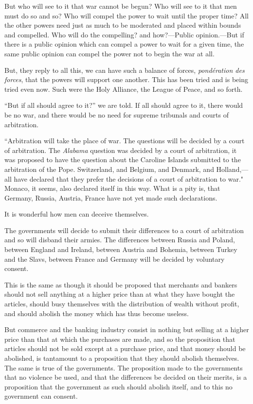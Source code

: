 \documentclass{book}
\begin{document}
But who will see to it that war cannot be begun? Who will see to it that men must do so and so? Who will compel the power to wait until the proper time? All the other powers need just as much to be moderated and placed within bounds and compelled. Who will do the compelling? and how?—Public opinion.—But if there is a public opinion which can compel a power to wait for a given time, the same public opinion can compel the power not to begin the war at all.

But, they reply to all this, we can have such a balance of forces, \emph{pondération des forces}, that the powers will support one another. This has been tried and is being tried even now. Such were the Holy Alliance, the League of Peace, and so forth.

“But if all should agree to it?” we are told. If all should agree to it, there would be no war, and there would be no need for supreme tribunals and courts of arbitration.

“Arbitration will take the place of war. The questions will be decided by a court of arbitration. The \emph{Alabama} question was decided by a court of arbitration, it was proposed to have the question about the Caroline Islands submitted to the arbitration of the Pope. Switzerland, and Belgium, and Denmark, and Holland,—all have declared that they prefer the decisions of a court of arbitration to war." Monaco, it seems, also declared itself in this way. What is a pity is, that Germany, Russia, Austria, France have not yet made such declarations.

It is wonderful how men can deceive themselves.

The governments will decide to submit their differences to a court of arbitration and so will disband their armies. The differences between Russia and Poland, between England and Ireland, between Austria and Bohemia, between Turkey and the Slavs, between France and Germany will be decided by voluntary consent.

This is the same as though it should be proposed that merchants and bankers should not sell anything at a higher price than at what they have bought the articles, should busy themselves with the distribution of wealth without profit, and should abolish the money which has thus become useless.

But commerce and the banking industry consist in nothing but selling at a higher price than that at which the purchases are made, and so the proposition that articles should not be sold except at a purchase price, and that money should be abolished, is tantamount to a proposition that they should abolish themselves. The same is true of the governments. The proposition made to the governments that no violence be used, and that the differences be decided on their merits, is a proposition that the government as such should abolish itself, and to this no government can consent.
\end{document}

